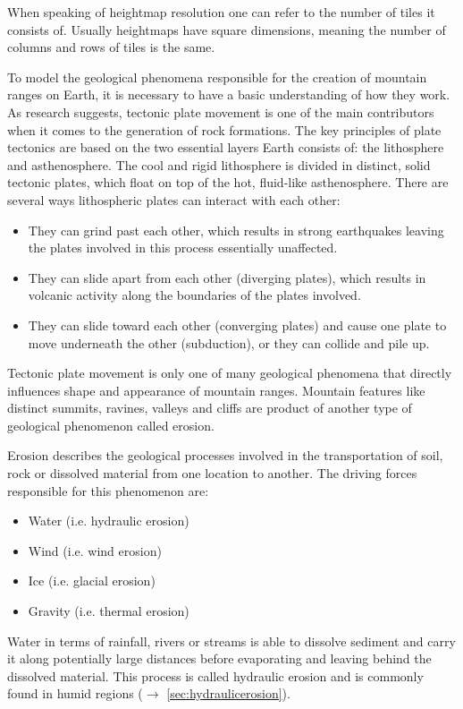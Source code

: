 \documentclass[11pt,a4paper,twoside,openright]{report}
\begin{document}
When speaking of heightmap resolution one can refer to the number of tiles it consists of. Usually heightmaps have square dimensions, meaning the number of columns and rows of tiles is the same.

To model the geological phenomena responsible for the creation of mountain ranges on Earth, it is necessary to have a basic understanding of how they work. As research suggests, tectonic plate movement is one of the main contributors when it comes to the generation of rock formations. The key principles of plate tectonics are based on the two essential layers Earth consists of: the lithosphere and asthenosphere. The cool and rigid lithosphere is divided in distinct, solid tectonic plates, which float on top of the hot, fluid-like asthenosphere. There are several ways lithospheric plates can interact with each other:
\begin{itemize}
  \item They can grind past each other, which results in strong earthquakes leaving the plates involved in this process essentially unaffected.
  \item They can slide apart from each other (diverging plates), which results in volcanic activity along the boundaries of the plates involved.
  \item They can slide toward each other (converging plates) and cause one plate to move underneath the other (subduction), or they can collide and pile up.
\end{itemize}
Tectonic plate movement is only one of many geological phenomena that directly influences shape and appearance of mountain ranges. Mountain features like distinct summits, ravines, valleys and cliffs are product of another type of geological phenomenon called erosion.

Erosion describes the geological processes involved in the transportation of soil, rock or dissolved material from one location to another. The driving forces responsible for this phenomenon are:
\begin{itemize}
  \item Water (i.e. hydraulic erosion)
  \item Wind (i.e. wind erosion)
  \item Ice (i.e. glacial erosion)
  \item Gravity (i.e. thermal erosion)
\end{itemize}

Water in terms of rainfall, rivers or streams is able to dissolve sediment and carry it along potentially large distances before evaporating and leaving behind the dissolved material. This process is called hydraulic erosion and is commonly found in humid regions ($\rightarrow$ \cref{sec:hydraulicerosion}).
\end{document}

